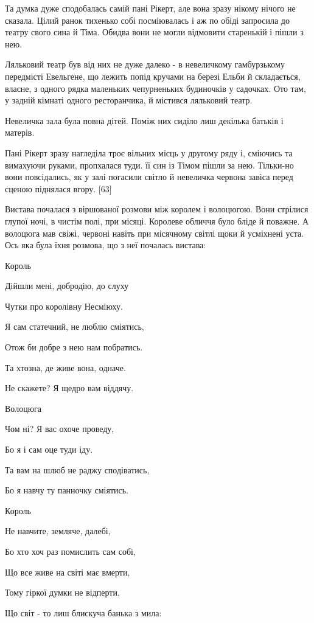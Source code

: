 Та думка дуже сподобалась самій пані Рікерт, але вона зразу нікому нічого не сказала. Цілий ранок тихенько собі посміювалась і аж по обіді запросила до театру свого сина й Тіма. Обидва вони не могли відмовити старенькій і пішли з нею.

Ляльковий театр був від них не дуже далеко - в невеличкому гамбурзькому передмісті Евельгене, що лежить попід кручами на березі Ельби й складається, власне, з одного рядка маленьких чепурненьких будиночків у садочках. Ото там, у задній кімнаті одного ресторанчика, й містився ляльковий театр.

Невеличка зала була повна дітей. Поміж них сиділо лиш декілька батьків і матерів.

Пані Рікерт зразу нагледіла троє вільних місць у другому ряду і, сміючись та вимахуючи руками, пропхалася туди. її син із Тімом пішли за нею. Тільки-но вони повсідались, як у залі погасили світло й невеличка червона завіса перед сценою піднялася вгору. [63]

Вистава почалася з віршованої розмови між королем і волоцюгою. Вони стрілися глупої ночі, в чистім полі, при місяці. Королеве обличчя було бліде й поважне. А волоцюга мав свіжі, червоні навіть при місячному світлі щоки й усміхнені уста. Ось яка була їхня розмова, що з неї почалась вистава:

Король

Дійшли мені, добродію, до слуху

Чутки про королівну Несміюху.

Я сам статечний, не люблю сміятись,

Отож би добре з нею нам побратись.

Та хтозна, де живе вона, одначе.

Не скажете? Я щедро вам віддячу.

Волоцюга

Чом ні? Я вас охоче проведу,

Бо я і сам оце туди іду.

Та вам на шлюб не раджу сподіватись,

Бо я навчу ту панночку сміятись.

Король

Не навчите, земляче, далебі,

Бо хто хоч раз помислить сам собі,

Що все живе на світі має вмерти,

Тому гіркої думки не відперти,

Що світ - то лиш блискуча банька з мила:


